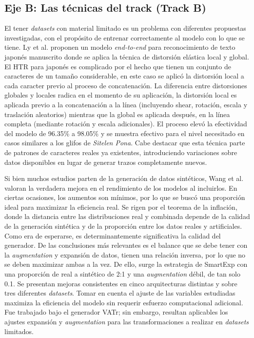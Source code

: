 \documentclass[conference]{IEEEtran}
\begin{document}
\subsection{Eje B: Las técnicas del track (Track B)} \label{sec:ejeB}
El tener \textit{datasets} con material limitado es un problema con diferentes propuestas investigadas, con el propósito de entrenar correctamente al modelo con lo que se tiene. Ly et al. \cite{ly_training_2018} proponen un modelo \textit{end-to-end} para reconocimiento de texto japonés manuscrito donde se aplica la técnica de distorsión elástica local y global. El HTR para japonés es complicado por el hecho que tienen un conjunto de caracteres de un tamaño considerable, en este caso se aplicó la distorsión local a cada caracter previo al proceso de concatenación. La diferencia entre distorsiones globales y locales radica en el momento de su aplicación, la distorsión local es aplicada previo a la concatenación a la línea (incluyendo shear, rotación, escala y traslación aleatorios) mientras que la global es aplicada después, en la línea completa (mediante rotación y escala adicionales). El proceso elevó la efectividad del modelo de 96.35\% a 98.05\% y se muestra efectivo para el nivel necesitado en casos similares a los glifos de \textit{Sitelen Pona}. Cabe destacar que esta técnica parte de patrones de caracteres reales ya existentes, introduciendo variaciones sobre datos disponibles en lugar de generar trazos completamente nuevos.

Si bien muchos estudios parten de la generación de datos sintéticos, Wang et al. \cite{wang_smartexp_2025} valoran la verdadera mejora en el rendimiento de los modelos al incluirlos. En ciertas ocasiones, los aumentos son mínimos, por lo que se buscó una proporción ideal para maximizar la eficiencia real. Se rigen por el teorema de la inflación, donde la distancia entre las distribuciones real y combinada depende de la calidad de la generación sintética y de la proporción entre los datos reales y artificiales. Como era de esperarse, es determinantemente significativa la calidad del generador. De las conclusiones más relevantes es el balance que se debe tener con la \textit{augmentation} y expansión de datos, tienen una relación inversa, por lo que no se deben maximizar ambas a la vez. De ello, surge la estrategia de SmartExp con una proporción de real a sintético de 2:1 y una \textit{augmentation} débil, de tan solo 0.1. Se presentan mejoras consistentes en cinco arquitecturas distintas y sobre tres diferentes \textit{datasets}. Tomar en cuenta el ajuste de las variables estudiadas maximiza la eficiencia del modelo sin requerir esfuerzo computacional adicional. Fue trabajado bajo el generador VATr; sin embargo, resultan aplicables los ajustes expansión y \textit{augmentation} para las transformaciones a realizar en \textit{datasets} limitados.
\end{document}
